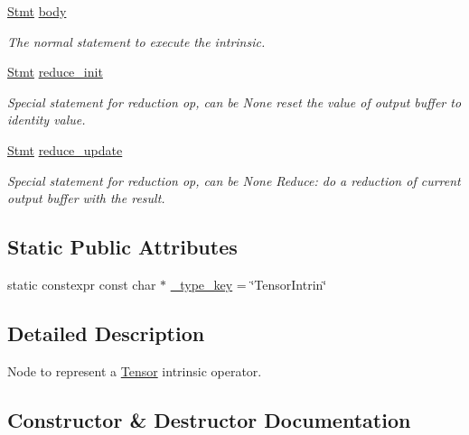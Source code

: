 \begin{DoxyCompactItemize}
\hyperlink{classtvm_1_1tir_1_1Stmt}{Stmt} \hyperlink{classtvm_1_1te_1_1TensorIntrinNode_a9f90aba58e51d525a56f7be4fbcf79e3}{body}
\begin{DoxyCompactList}\small\item\em The normal statement to execute the intrinsic. \end{DoxyCompactList}\item 
\hyperlink{classtvm_1_1tir_1_1Stmt}{Stmt} \hyperlink{classtvm_1_1te_1_1TensorIntrinNode_a63b22c1a14e6ce3bdc2900019600efee}{reduce\+\_\+init}
\begin{DoxyCompactList}\small\item\em Special statement for reduction op, can be None reset the value of output buffer to identity value. \end{DoxyCompactList}\item 
\hyperlink{classtvm_1_1tir_1_1Stmt}{Stmt} \hyperlink{classtvm_1_1te_1_1TensorIntrinNode_a8d4a891a69aec271eca1c57b16030755}{reduce\+\_\+update}
\begin{DoxyCompactList}\small\item\em Special statement for reduction op, can be None Reduce\+: do a reduction of current output buffer with the result. \end{DoxyCompactList}\end{DoxyCompactItemize}
\subsection*{Static Public Attributes}
\begin{DoxyCompactItemize}
\item 
static constexpr const char $\ast$ \hyperlink{classtvm_1_1te_1_1TensorIntrinNode_a5c8fe93d672192c7ba3524f2eeed2763}{\+\_\+type\+\_\+key} = \char`\"{}Tensor\+Intrin\char`\"{}
\end{DoxyCompactItemize}


\subsection{Detailed Description}
Node to represent a \hyperlink{classtvm_1_1te_1_1Tensor}{Tensor} intrinsic operator. 

\subsection{Constructor \& Destructor Documentation}
